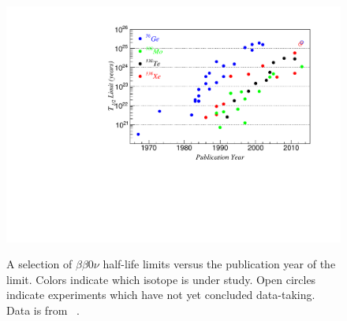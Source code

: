 \begin{figure}
\begin{center}
\includegraphics[keepaspectratio=true,width=\textwidth]{halflife_vs_year.pdf}
\end{center}
\renewcommand{\baselinestretch}{1}
\small\normalsize
\begin{quote}
\caption{A selection of $\beta\beta 0\nu$ half-life limits versus the publication year of the limit.  Colors indicate which isotope is under study.  Open circles indicate experiments which have not yet concluded data-taking.  Data is from ~\cite{
PhysRevC.85.045504,PhysRevLett.110.062502,bb0nSearch2012,PhysRevLett.111.122503,
KlapdorDissent,PhysRevLett.83.41,PhysRevC.59.2108,PhysRevD.65.092007,Andreotti2011822,PhysRevC.78.035502,
PhysRevLett.95.142501,Arnaboldi2004260,Baudis1997219,PhysRevLett.95.182302,NEMO2004,NEMO3-2013-100Mo,
doi:10.1142/S0217732390001475,Bernabei200223,Balysh1994176,0954-3899-17-S-014,Arnaboldi2003167,
1112.0859,Baksan2006Gavriljuk,Luescher1998407,Alessandrello1992176,Alessandrello1994519,Alessandrello1998156,
Alessandrello200013,PhysRevD.48.1009,PhysRevLett.59.419,Bellotti1991193,Bellotti1989209,BellottiMilano1986,
Bellotti1984450,Bellotti198372,BellottiMilano1982,PhysRevD.45.2548,PhysRevC.63.065501,0305-4616-13-6-012,
Ejiri199685,Ejiri199117,PhysRevC.55.474,PhysRevLett.71.831,PhysRevLett.63.1671,Fisher1989257,
PhysRevLett.50.721,PhysRevC.34.666,PhysRevLett.53.141,PhysRevD.51.2090,Forster1984301,PhysRevC.56.2451,
Barabash1989273,Fiorini1967602,Fiorini1973,Barabanov:1986iz,Vasilev:1990gi,PhysRevC.38.895}.}
\label{fig:Halflife_vs_year}
\end{quote}
\end{figure}
\renewcommand{\baselinestretch}{2}
\small\normalsize

